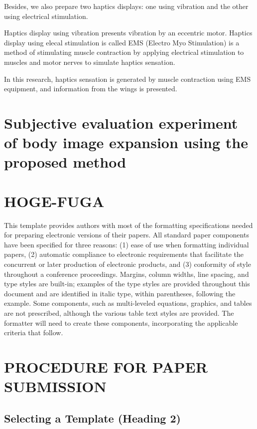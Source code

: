 \documentclass[letterpaper, 10 pt, conference]{ieeeconf}  %
\begin{document}
                        Besides, we also prepare two haptics displays: one using vibration and the other using electrical stimulation.

                        Haptics display using vibration presents vibration by an eccentric motor.  
                        Haptics display using elecal stimulation is called EMS (Electro Myo Stimulation) is a method of stimulating muscle contraction by applying electrical stimulation to muscles and motor nerves to simulate haptics sensation.  

                        In this research, haptics sensation is generated by muscle contraction using EMS equipment, and information from the wings is presented.  


\section{Subjective evaluation experiment of body image expansion using the proposed method}




\section{HOGE-FUGA}
This template provides authors with most of the formatting specifications needed for preparing electronic versions of their papers. All standard paper components have been specified for three reasons: (1) ease of use when formatting individual papers, (2) automatic compliance to electronic requirements that facilitate the concurrent or later production of electronic products, and (3) conformity of style throughout a conference proceedings. Margins, column widths, line spacing, and type styles are built-in; examples of the type styles are provided throughout this document and are identified in italic type, within parentheses, following the example. Some components, such as multi-leveled equations, graphics, and tables are not prescribed, although the various table text styles are provided. The formatter will need to create these components, incorporating the applicable criteria that follow.

\section{PROCEDURE FOR PAPER SUBMISSION}

\subsection{Selecting a Template (Heading 2)}
\end{document}
